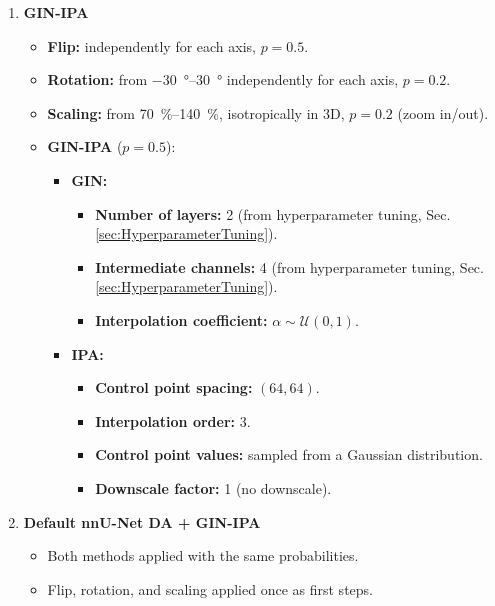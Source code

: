 \begin{enumerate}
    \item \textbf{GIN-IPA}
    \begin{itemize}
        \item \textbf{Flip:} independently for each axis, $p=0.5$.
        \item \textbf{Rotation:} from \qtyrange{-30}{30}{\degree} independently for each axis, $p=0.2$.
        \item \textbf{Scaling:} from \qtyrange{70}{140}{\percent}, isotropically in 3D, $p=0.2$ (zoom in/out).
        \item \textbf{GIN-IPA} ($p=0.5$):
        \begin{itemize}
            \item \textbf{GIN:}
            \begin{itemize}[label=$\diamond$]
                \item \textbf{Number of layers:} 2 (from hyperparameter tuning, Sec.\,\ref{sec:HyperparameterTuning}).
                \item \textbf{Intermediate channels:} 4 (from hyperparameter tuning, Sec.\,\ref{sec:HyperparameterTuning}).
                \item \textbf{Interpolation coefficient:} $\alpha \sim \mathcal{U}(0, 1)$.
            \end{itemize}
            \item \textbf{IPA:}
            \begin{itemize}[resume*]
                \item \textbf{Control point spacing:} $(64, 64)$.
                \item \textbf{Interpolation order:} \num{3}.
                \item \textbf{Control point values:} sampled from a Gaussian distribution.
                \item \textbf{Downscale factor:} \num{1} (no downscale).
            \end{itemize}
        \end{itemize}
    \end{itemize}

    \item \textbf{Default nnU-Net DA + GIN-IPA}
    \begin{itemize}
        \item Both methods applied with the same probabilities.
        \item Flip, rotation, and scaling applied once as first steps.
    \end{itemize}

\end{enumerate}

